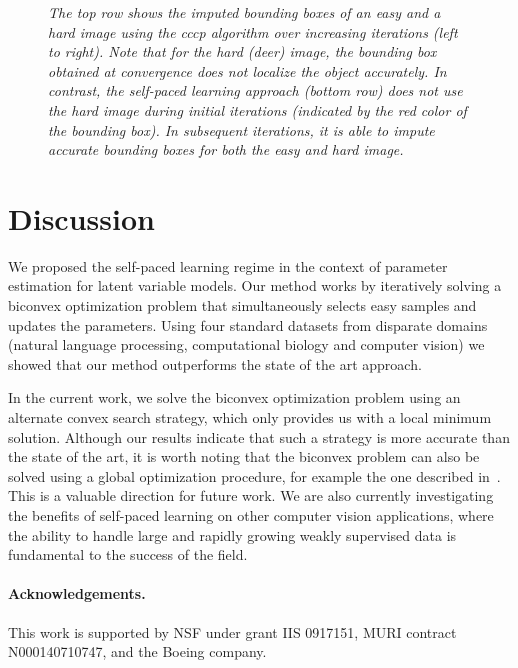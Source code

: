 \documentclass{article}
\newcommand{\mysection}[1]{\vspace{-4mm}\section{#1}\vspace{-4mm}}
\newcommand{\myparagraph}[1]{\vspace{-2mm}\paragraph{#1}}
\newcommand{\mycaption}[1]{\vspace{-3mm}\caption{\em \footnotesize #1}\vspace{-3mm}}
\begin{document}
\begin{figure}
\centerline{}
\mycaption{\it The top row shows the imputed bounding boxes of an easy
and a hard image using the {\sc cccp} algorithm over increasing
iterations (left to right). Note that for the hard (deer) image, the bounding
box obtained at convergence does not localize the object
accurately. In contrast, the self-paced learning approach (bottom row)
does not use the hard image during initial iterations (indicated by
the red color of the bounding box). In subsequent iterations, it is
able to impute accurate bounding boxes for both the easy and hard
image.}
\label{fig:objectLocalize}
\end{figure}


\mysection{Discussion}
\label{sec:discussion}
We proposed the self-paced learning regime in the context of
parameter estimation for latent variable models. Our method works by iteratively
solving a biconvex optimization problem that simultaneously
selects easy samples and updates the parameters. 
Using four standard datasets from disparate domains
(natural language processing, computational biology and
computer vision) we showed that our method outperforms the state
of the art approach.

In the current work, we solve the biconvex optimization problem using
an alternate convex search strategy, which only provides us with a
local minimum solution. Although our results indicate that such a
strategy is more accurate than the state of the art, it is worth noting that
the biconvex problem can also be solved using a global optimization
procedure, for example the one described in~\cite{floudasjota93}.
This is a valuable direction for future work. We are also currently
investigating the benefits of self-paced learning on other computer vision
applications, where the ability to handle large and rapidly growing weakly supervised data
is fundamental to the success of the field.

\myparagraph{Acknowledgements.}
This work is supported by NSF under grant IIS 0917151, MURI contract N000140710747, and the Boeing company.

\newpage



\end{document}
